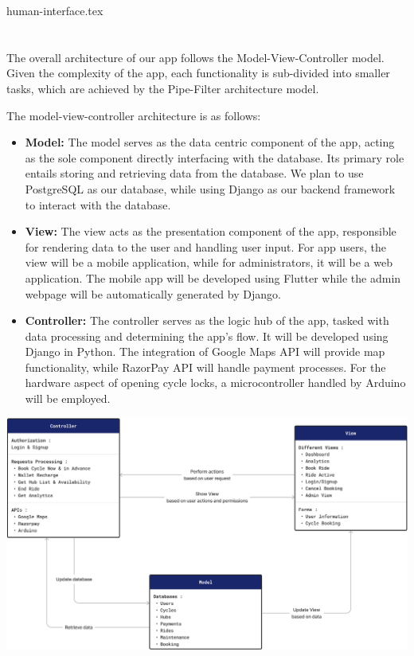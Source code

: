 \documentclass[11pt]{article}
\begin{document}
 {human-interface.tex}

\newpage
\section{}
The overall architecture of our app follows the Model-View-Controller model. Given the complexity of the app, each functionality is sub-divided into smaller tasks, which are achieved by the Pipe-Filter architecture model.

The model-view-controller architecture is as follows:
\begin{itemize}
  \item \textbf{Model:} The model serves as the data centric component of the app, acting as the sole component directly interfacing with the database. Its primary role entails storing and retrieving data from the database. We plan to use PostgreSQL as our database, while using Django as our backend framework to interact with the database.
  \item \textbf{View:} The view acts as the presentation component of the app, responsible for rendering data to the user and handling user input. For app users, the view will be a mobile application, while for administrators, it will be a web application. The mobile app will be developed using Flutter while the admin webpage will be automatically generated by Django.
  \item \textbf{Controller:} The controller serves as the logic hub of the app, tasked with data processing and determining the app's flow. It will be developed using Django in Python. The integration of Google Maps API will provide map functionality, while RazorPay API will handle payment processes. For the hardware aspect of opening cycle locks, a microcontroller handled by Arduino will be employed.
\end{itemize}
\vspace{0.5cm}
\begin{center}
  \includegraphics[scale=0.2]{architecture-images/overall.png}
\end{center}
\end{document}
